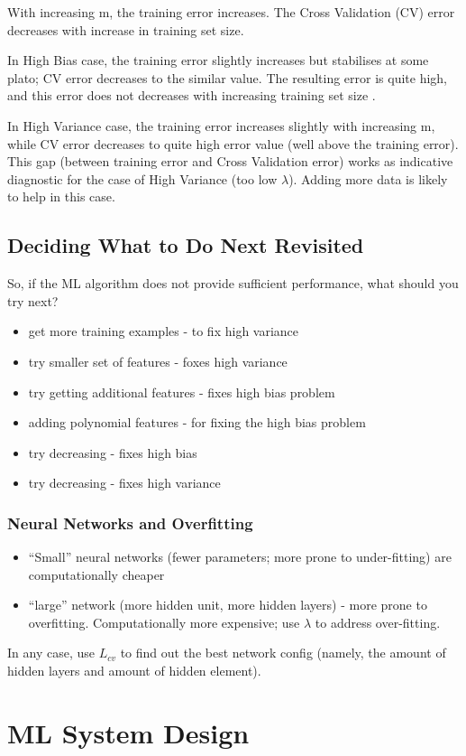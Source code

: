 \documentclass{scrartcl}
\begin{document}
With increasing m, the training error increases. The Cross Validation
(CV) error decreases with increase in training set size.

In High Bias case, the training error slightly increases but
stabilises at some plato; CV error decreases to the similar value. The
resulting error is quite high, and this {\bg error does not decreases
  with increasing training set size }.

In High Variance case, the training error increases slightly with
increasing m, while CV error decreases to quite high error value (well
above the training error). This gap (between training error and Cross
Validation error) works as indicative diagnostic for the case of High
Variance (too low $\lambda$). Adding more data is likely to help in
this case.

\subsection{Deciding What to Do Next Revisited}
\label{sec:10-7}

So, if the ML algorithm does not provide sufficient performance, what
should you try next?
\begin{itemize}
\item get more training examples - to fix high variance
\item try smaller set of features - foxes high variance
\item try getting additional features - fixes high bias problem
\item adding polynomial features - for fixing the high bias problem
\item try decreasing - fixes high bias
\item try decreasing - fixes high variance
\end{itemize}

\subsubsection{Neural Networks and Overfitting}
\label{sec:10-7-1}
\begin{itemize}
\item ``Small'' neural networks (fewer parameters; more prone to
  under-fitting) are computationally cheaper 
\item ``large'' network (more hidden unit, more hidden layers) - more
  prone to overfitting. Computationally more expensive; use $\lambda$
  to address over-fitting.
\end{itemize}
In any case, use $L_{cv}$ to find out the best network config (namely,
the amount of hidden layers and amount of hidden element).

\section{ML System Design}
\label{sec:11}
\end{document}
